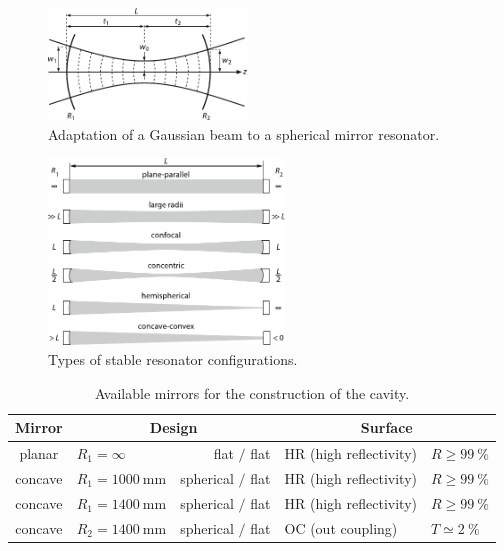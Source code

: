 \begin{figure}[H]
	\centering
	\includegraphics[width=0.47\textwidth]{content/graphics/beam.pdf}
	\caption{Adaptation of a Gaussian beam to a spherical mirror resonator. \cite{Eichler_2018}}
	\label{fig:beam}
\end{figure}

\begin{figure}[H]
	\centering
	\includegraphics[width=0.56\textwidth]{content/graphics/resonators.pdf}
	\caption{Types of stable resonator configurations. \cite{Eichler_2018}}
	\label{fig:resonators}
\end{figure}

\begin{table}
	\centering
	\caption{Available mirrors for the construction of the cavity. \cite{hene}}
	\begin{tabular}{clrll}
		\toprule
		Mirror & \multicolumn{2}{c}{Design} & \multicolumn{2}{c}{Surface} \\
		\midrule
		planar  & $R_1 = \infty$ & flat $\mathbin{/}$ flat & HR (high reflectivity) & $R \geq \qty{99}{\percent}$ \\
		concave & $R_1 = \qty{1000}{\milli\meter}$ & spherical $\mathbin{/}$ flat & HR (high reflectivity) & $R \geq \qty{99}{\percent}$ \\
		concave & $R_1 = \qty{1400}{\milli\meter}$ & spherical $\mathbin{/}$ flat & HR (high reflectivity) & $R \geq \qty{99}{\percent}$ \\
		concave & $R_2 = \qty{1400}{\milli\meter}$ & spherical $\mathbin{/}$ flat & OC (out coupling) & $T \simeq \qty{2}{\percent}$ \\
		\bottomrule
	\end{tabular}
	\label{tab:config}
\end{table}

